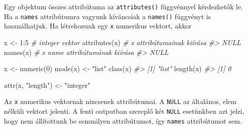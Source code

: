 \documentclass[
]{book}
\newenvironment{Shaded}{\begin{snugshade}}{\end{snugshade}}
\newcommand{\CommentTok}[1]{\textcolor[rgb]{0.56,0.35,0.01}{\textit{#1}}}
\newcommand{\DecValTok}[1]{\textcolor[rgb]{0.00,0.00,0.81}{#1}}
\newcommand{\FunctionTok}[1]{\textcolor[rgb]{0.00,0.00,0.00}{#1}}
\newcommand{\NormalTok}[1]{#1}
\newcommand{\OtherTok}[1]{\textcolor[rgb]{0.56,0.35,0.01}{#1}}
\newcommand{\SpecialCharTok}[1]{\textcolor[rgb]{0.00,0.00,0.00}{#1}}
\newcommand{\StringTok}[1]{\textcolor[rgb]{0.31,0.60,0.02}{#1}}
\begin{document}
Egy objektum összes attribútuma az \texttt{attributes()} függvénnyel kérdezhetők le. Ha a \texttt{names} attribútumra vagyunk kíváncsiak a \texttt{names()} függvényt is használhatjuk. Ha létrehozunk egy \texttt{x} numerikus vektort, akkor

\begin{Shaded}
\begin{Highlighting}[]
\NormalTok{x }\OtherTok{\textless{}{-}} \DecValTok{1}\SpecialCharTok{:}\DecValTok{5}        \CommentTok{\# integer vektor}
\FunctionTok{attributes}\NormalTok{(x)   }\CommentTok{\# x attribútumainak kiírása }
\CommentTok{\#\textgreater{} NULL}
\FunctionTok{names}\NormalTok{(x)        }\CommentTok{\# x name attribútumának kiírása}
\CommentTok{\#\textgreater{} NULL}

\NormalTok{x }\OtherTok{\textless{}{-}} \FunctionTok{numeric}\NormalTok{(}\DecValTok{0}\NormalTok{)}
\FunctionTok{mode}\NormalTok{(x) }\OtherTok{\textless{}{-}} \StringTok{"list"}
\FunctionTok{class}\NormalTok{(x)}
\CommentTok{\#\textgreater{} [1] "list"}
\FunctionTok{length}\NormalTok{(x)}
\CommentTok{\#\textgreater{} [1] 0}

\FunctionTok{attr}\NormalTok{(x, }\StringTok{"length"}\NormalTok{) }\OtherTok{\textless{}{-}} \StringTok{"integer"}
\end{Highlighting}
\end{Shaded}

Az \texttt{x} numerikus vektornak nincsenek attribútumai. A \texttt{NULL} az általános, elem nélküli vektort jelenti. A fenti outputban szereplő két \texttt{NULL} esetünkben azt jelzi, hogy nem állítottunk be semmilyen attribútumot, így \texttt{names} attribútumot sem.

\begin{Shaded}
\end{Shaded}
\end{document}
